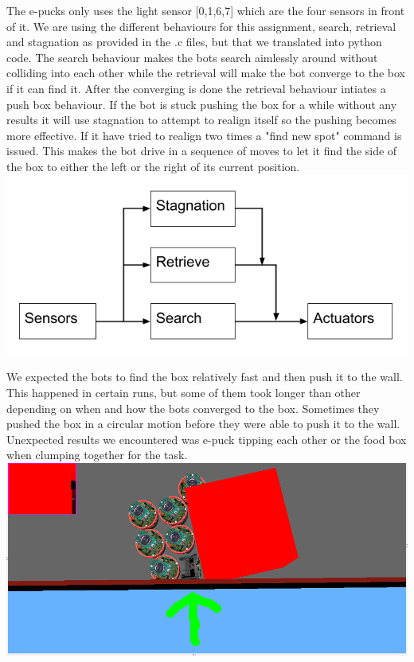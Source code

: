 \documentclass[12pt, a4paper]{article}
\begin{document}
The e-pucks only uses the light sensor [0,1,6,7] which are the four sensors in front of it. We are using the different behaviours for this assignment, search, retrieval and stagnation as provided in the .c files, but that we translated into python code. 
The search behaviour makes the bots search aimlessly around without colliding into each other while the retrieval will make the bot converge to the box if it can find it. After the converging is done the retrieval behaviour intiates a push box behaviour. If the bot is stuck pushing the box for a while without any results it will use stagnation to attempt to realign itself so the pushing becomes more effective. If it have tried to realign two times a "find new spot" command is issued. This makes the bot drive in a sequence of moves to let it find the side of the box to either the left or the right of its current position.
\includegraphics[width=\linewidth]{Brooks-lite.png}

We expected the bots to find the box relatively fast and then push it to the wall. This happened in certain runs, but some of them took longer than other depending on when and how the bots converged to the box. Sometimes they pushed the box in a circular motion before they were able to push it to the wall.
Unexpected results we encountered was e-puck tipping each other or the food box when clumping together for the task.\\
\includegraphics[width=\linewidth]{1.mandown.png}
\end{document}
